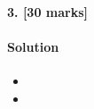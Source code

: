 \documentclass[a4paper]{scrartcl}
\begin{document}
\paragraph{3. [30 marks]}
\label{sec:Question 3}
\paragraph{Solution}
\begin{itemize}
  \item
  \item
\end{itemize}
\end{document}
